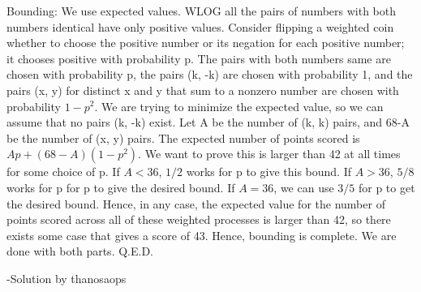 \begin{enumerate}
 Bounding: We use expected values. WLOG all the pairs of numbers with both numbers identical have only positive values. Consider flipping a weighted coin whether to choose the positive number or its negation for each positive number; it chooses positive with probability p. The pairs with both numbers same are chosen with probability p, the pairs (k, -k) are chosen with probability 1, and the pairs (x, y) for distinct x and y that sum to a nonzero number are chosen with probability $1-p^2$. We are trying to minimize the expected value, so we can assume that no pairs (k, -k) exist. Let A be the number of (k, k) pairs, and 68-A be the number of (x, y) pairs. The expected number of points scored is $Ap + (68-A)(1-p^2)$. We want to prove this is larger than 42 at all times for some choice of p. If $A < 36$, $1/2$ works for p to give this bound. If $A > 36$, $5/8$ works for p for p to give the desired bound. If $A = 36$, we can use $3/5$ for p to get the desired bound. Hence, in any case, the expected value for the number of points scored across all of these weighted processes is larger than 42, so there exists some case that gives a score of 43. Hence, bounding is complete. We are done with both parts. Q.E.D.

 -Solution by thanosaops

 


\end{enumerate}